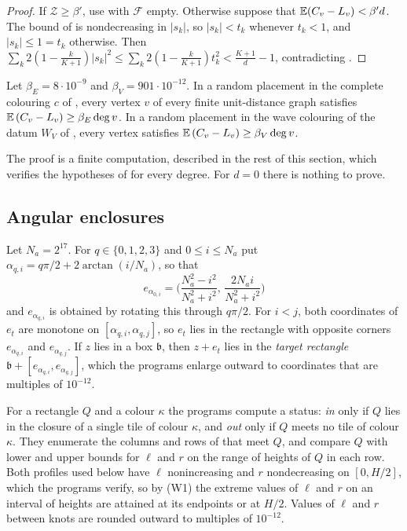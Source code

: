 \documentclass[11pt,colorlinks]{charlie}
\begin{document}
\begin{proof}
If $\mathcal Z\ge\beta'$, use  with $\mathcal F$ empty. Otherwise suppose that $\mathbb{E}(C_v-L_v)<\beta'd$. The bound of  is nondecreasing in $|s_k|$, so $|s_k|<t_k$ whenever $t_k<1$, and $|s_k|\le1=t_k$ otherwise. Then $\sum_k2(1-\frac k{K+1})|s_k|^2\le\sum_k2(1-\frac k{K+1})t_k^2<\frac{K+1}d-1$, contradicting .
\end{proof}

\begin{proposition}\label{prop:stars}
Let $\beta_E=8\cdot10^{-9}$ and $\beta_V=901\cdot10^{-12}$. In a random placement in the complete colouring $c$ of , every vertex $v$ of every finite unit-distance graph satisfies $\mathbb{E}\,(C_v-L_v)\ge\beta_E\deg v$. In a random placement in the wave colouring of the datum $W_V$ of , every vertex satisfies $\mathbb{E}\,(C_v-L_v)\ge\beta_V\deg v$.
\end{proposition}

The proof is a finite computation, described in the rest of this section, which verifies the hypotheses of  for every degree. For $d=0$ there is nothing to prove.

\subsection{Angular enclosures}\label{sec:angular}
Let $N_a=2^{17}$. For $q\in\{0,1,2,3\}$ and $0\le i\le N_a$ put $\alpha_{q,i}=q\pi/2+2\arctan(i/N_a)$, so that
\[
 e_{\alpha_{0,i}}=\Big(\frac{N_a^2-i^2}{N_a^2+i^2},\,\frac{2N_ai}{N_a^2+i^2}\Big)
\]
and $e_{\alpha_{q,i}}$ is obtained by rotating this through $q\pi/2$. For $i<j$, both coordinates of $e_t$ are monotone on $[\alpha_{q,i},\alpha_{q,j}]$, so $e_t$ lies in the rectangle with opposite corners $e_{\alpha_{q,i}}$ and $e_{\alpha_{q,j}}$. If $z$ lies in a box $\mathfrak b$, then $z+e_t$ lies in the \emph{target rectangle} $\mathfrak b+[e_{\alpha_{q,i}},e_{\alpha_{q,j}}]$, which the programs enlarge outward to coordinates that are multiples of $10^{-12}$.

For a rectangle $Q$ and a colour $\kappa$ the programs compute a status: \emph{in} only if $Q$ lies in the closure of a single tile of colour $\kappa$, and \emph{out} only if $Q$ meets no tile of colour $\kappa$. They enumerate the columns and rows of  that meet $Q$, and compare $Q$ with lower and upper bounds for $\ell$ and $r$ on the range of heights of $Q$ in each row. Both profiles used below have $\ell$ nonincreasing and $r$ nondecreasing on $[0,H/2]$, which the programs verify, so by (W1) the extreme values of $\ell$ and $r$ on an interval of heights are attained at its endpoints or at $H/2$. Values of $\ell$ and $r$ between knots are rounded outward to multiples of $10^{-12}$.
\end{document}

